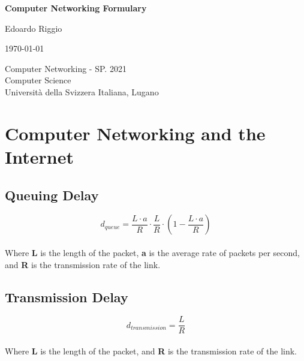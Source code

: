 \documentclass{article}
\begin{document}
\begin{titlepage}
    \begin{center}
        \vspace*{1cm}
        
        \Huge
        \textbf{Computer Networking Formulary}
        
        \vspace{0.5cm}
        \LARGE
        
        \vspace{.5cm}
        
        Edoardo Riggio
   		  \vspace{1.5cm}
       
        \vfill
        
        \today
        
        \vspace{.8cm}
          \Large
          Computer Networking - SP. 2021 \\
        Computer Science\\
        Universit\`{a} della Svizzera Italiana, Lugano\\
        
    \end{center}
\end{titlepage}

\tableofcontents

\newpage

\section{Computer Networking and the Internet}
\subsection{Queuing Delay}
\vspace{.3cm}
\[ d_{queue} = \frac{L \cdot a}{R} \cdot \frac{L}{R} \cdot \left( 1 - \frac{L \cdot a}{R} \right) \] \\
Where \textbf{L} is the length of the packet, \textbf{a} is the average rate of packets per second, and \textbf{R} is the transmission rate of the link.

\subsection{Transmission Delay}
\vspace{.3cm}
\[ d_{transmission} = \frac{L}{R} \] \\
Where \textbf{L} is the length of the packet, and \textbf{R} is the transmission rate of the link.
\end{document}
